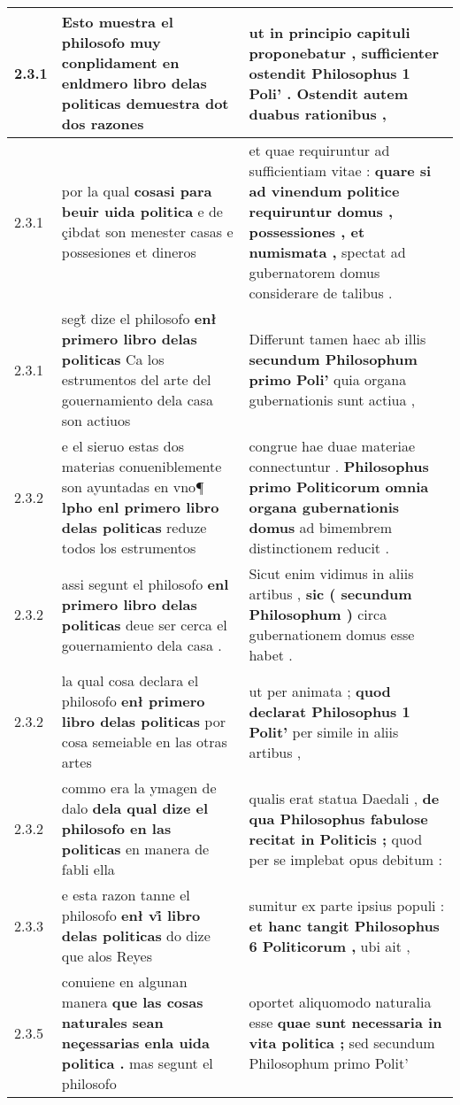 \begin{tabular}{|p{1cm}|p{6.5cm}|p{6.5cm}|}
2.3.1 & Esto muestra el philosofo muy conplidament en \textbf{ enldmero libro delas politicas } demuestra dot dos razones & ut in principio capituli proponebatur , \textbf{ sufficienter ostendit Philosophus 1 Poli’ . } Ostendit autem duabus rationibus , \\\hline
2.3.1 & por la qual \textbf{ cosasi para beuir uida politica } e de çibdat son menester casas e possesiones et dineros & et quae requiruntur ad sufficientiam vitae : \textbf{ quare si ad vinendum politice requiruntur domus , possessiones , et numismata , } spectat ad gubernatorem domus considerare de talibus . \\\hline
2.3.1 & segt̃ dize el philosofo \textbf{ enł primero libro delas politicas } Ca los estrumentos del arte del gouernamiento dela casa son actiuos & Differunt tamen haec ab illis \textbf{ secundum Philosophum primo Poli’ } quia organa gubernationis sunt actiua , \\\hline
2.3.2 & e el sieruo estas dos materias conueniblemente son ayuntadas en vno¶ \textbf{ lpho enl primero libro delas politicas } reduze todos los estrumentos & congrue hae duae materiae connectuntur . \textbf{ Philosophus primo Politicorum omnia organa gubernationis domus } ad bimembrem distinctionem reducit . \\\hline
2.3.2 & assi segunt el philosofo \textbf{ enl primero libro delas politicas } deue ser cerca el gouernamiento dela casa . & Sicut enim vidimus in aliis artibus , \textbf{ sic ( secundum Philosophum ) } circa gubernationem domus esse habet . \\\hline
2.3.2 & la qual cosa declara el philosofo \textbf{ enł primero libro delas politicas } por cosa semeiable en las otras artes & ut per animata ; \textbf{ quod declarat Philosophus 1 Polit’ } per simile in aliis artibus , \\\hline
2.3.2 & commo era la ymagen de dalo \textbf{ dela qual dize el philosofo en las politicas } en manera de fabli ella & qualis erat statua Daedali , \textbf{ de qua Philosophus fabulose recitat in Politicis ; } quod per se implebat opus debitum : \\\hline
2.3.3 & e esta razon tanne el philosofo \textbf{ enł vi̊ libro delas politicas } do dize que alos Reyes & sumitur ex parte ipsius populi : \textbf{ et hanc tangit Philosophus 6 Politicorum , } ubi ait , \\\hline
2.3.5 & conuiene en algunan manera \textbf{ que las cosas naturales sean neçessarias enla uida politica . } mas segunt el philosofo & oportet aliquomodo naturalia esse \textbf{ quae sunt necessaria in vita politica ; } sed secundum Philosophum primo Polit’ \\\hline

\end{tabular}
